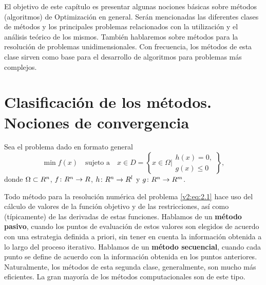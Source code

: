 
El objetivo de este capítulo es presentar algunas nociones básicas sobre métodos (algoritmos) de Optimización en general. Serán mencionadas las diferentes clases de métodos y los principales problemas relacionados con la utilización y el análisis teórico de los mismos. También hablaremos sobre métodos para la resolución de problemas unidimensionales. Con frecuencia, los métodos de esta clase sirven como base para el desarrollo de algoritmos para problemas más complejos.

\section{Clasificación de los métodos. Nociones de convergencia}

Sea el problema dado en formato general
\begin{equation}
    \min f(x) \quad \text{sujeto a} \quad x \in D = \left\{ x \in \Omega \mathrel{\bigg|} \begin{array}{l} h(x) = 0, \\ g(x) \le 0 \end{array} \right\},
    \label{v2:eq:2.1}
\end{equation}
donde $\Omega \subset R^n$, $f \colon R^n \to R$, $h \colon R^n \to R^l$ y $g \colon R^n \to R^m$.

Todo método para la resolución numérica del problema \eqref{v2:eq:2.1} hace uso del cálculo de valores de la función objetivo y de las restricciones, así como (típicamente) de las derivadas de estas funciones. Hablamos de un \textbf{método pasivo}, cuando los puntos de evaluación de estos valores son elegidos de acuerdo con una estrategia definida a priori, sin tener en cuenta la información obtenida a lo largo del proceso iterativo. Hablamos de un \textbf{método secuencial}, cuando cada punto se define de acuerdo con la información obtenida en los puntos anteriores. Naturalmente, los métodos de esta segunda clase, generalmente, son mucho más eficientes. La gran mayoría de los métodos computacionales son de este tipo.

